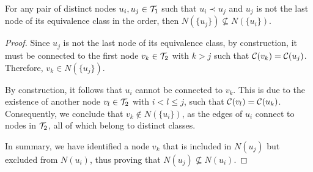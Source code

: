\begin{lemma} \label{lemma:distinct_neighborhoods_2}
    For any pair of distinct nodes $u_i, u_j \in \mathcal{T}_{1}$ such that $u_i \prec u_j$ and $u_j$ is not the last node of its equivalence class in the order, then $N(\{u_j\}) \not\subseteq N(\{u_i\})$.
\end{lemma}
\begin{proof}
    Since $u_j$ is not the last node of its equivalence class, by construction, it must be connected to the first node $v_k \in \mathcal{T}_{2}$ with $k > j$ such that $\mathcal{C}(v_k) = \mathcal{C}(u_j)$. Therefore, $v_k \in N(\{u_j\})$.

    By construction, it follows that $u_i$ cannot be connected to $v_k$. This is due to the existence of another node $v_l \in \mathcal{T}_{2}$ with $i < l \leq j$, such that $\mathcal{C}(v_l) = \mathcal{C}(u_k)$. Consequently, we conclude that $v_k \notin N(\{u_i\})$, as the edges of $u_i$ connect to nodes in $\mathcal{T}_{2}$, all of which belong to distinct classes.

    In summary, we have identified a node $v_k$ that is included in $N({u_j})$ but excluded from $N({u_i})$, thus proving that $N({u_j}) \not\subseteq N({u_i})$.
\end{proof}

\begin{comment}
\alessio{Non so se sia abbastanza questo claim, forse andrebbe dimostrato in entrambe le direzioni, quindi $N(\{u_i\}) \not\subseteq N(\{u_j\})$ e $N(\{u_j\}) \not\subseteq N(\{u_i\})$. In pratica la dimostrazione è la stessa ma va spiegata bene. A questo punto no so se il Lemma 4 serva, dato che deriva fa questa proprietà. Quindi in pratica il nodo sopra sarà connesso a nodi sopra il nodo sotto, mentre il nodo sotto sarà connesso ad altri nodi più sotto.
Dimostrando questo, puoi dire che ogni nodo aggiunge sempre almeno un nodo in più a $N(W)$, che sarà quindi almeno uguale a $|W|$. Occhio che però questo vale solo per i nodi che non sono gli ultimi della loro classe.} \davide{dovrei aver dimostrato le due strade e aggiunto nel lemma dell'esistenza del matching il caso in cui $u_j$ è l'ultimo nodo della sua classe.}
\begin{claim} \label{claim:prev_not_subset}
    For any pair of distinct nodes $u_i, u_j \in \treeset{1}$ with $i < j$, then we have that $N(\{u_i\}) \not\subseteq N(\{u_j\})$.
\end{claim}
\begin{proof}
    This is a direct consequence of the proof of \cref{lemma:distinct_neighborhoods}. In its proof, we showed that for any pair of nodes $u_i, u_j$ with $i < j$, there exists a neighbor $v_k \in N(\{u_i\})$ such that $k \leq j$. By \cref{lemma:greater_nodes}, any neighbor of $u_j$ must have an index greater than $j$. Therefore, $v_k$ cannot be a neighbor of $u_j$, which implies that $N(\{u_i\})$ cannot be a subset of $N(\{u_j\})$.
\end{proof}
\end{comment}

